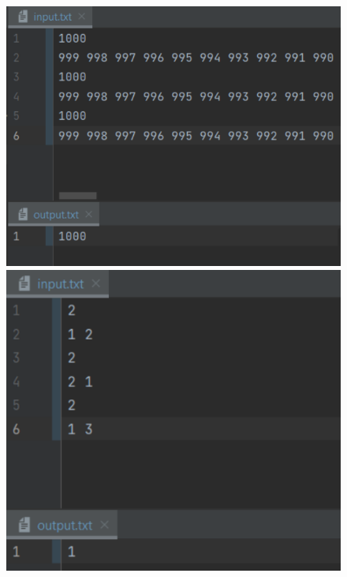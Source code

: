 \begin{figure}[H]
        \label{pic2}
	\includegraphics[scale=0.7]{fig/5_max.png}
	\includegraphics[scale=0.7]{fig/5_min.png}
\end{figure}

